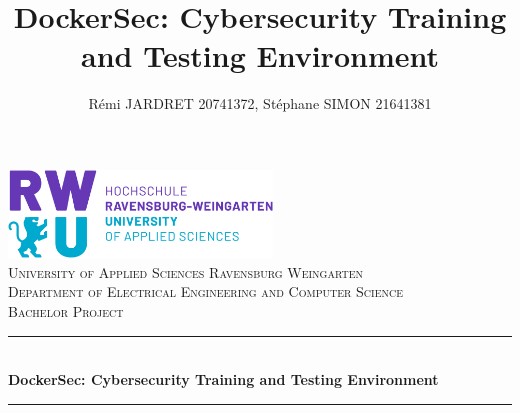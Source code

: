 \documentclass[a4paper,11pt,singlespacing]{article}
\title{DockerSec: Cybersecurity Training and Testing Environment}
\author{
	Rémi JARDRET 20741372,
	Stéphane SIMON 21641381
	}
\begin{document}
\setlength{\parindent}{0ex}


\begin{titlepage}
	
	\newcommand{\HRule}{\rule{\linewidth}{0.5mm}} %
	
	\center %
	
		
	
	\includegraphics[width=7cm]{Images/rwu_logo.png}\\[1.5cm] %
	
	\textsc{\LARGE University of Applied Sciences Ravensburg Weingarten}\\[1.5cm] 
	\textsc{\Large Department of
		Electrical Engineering
		and Computer Science}\\[0.5cm]
	\textsc{\large Bachelor Project}\\[0.5cm] 
	
	
	\HRule \\[0.4cm]
	{ \huge \bfseries DockerSec: Cybersecurity Training and Testing Environment}\\[0.4cm] 
	\HRule \\[3.5cm]
	
	

\end{titlepage}
\end{document}
